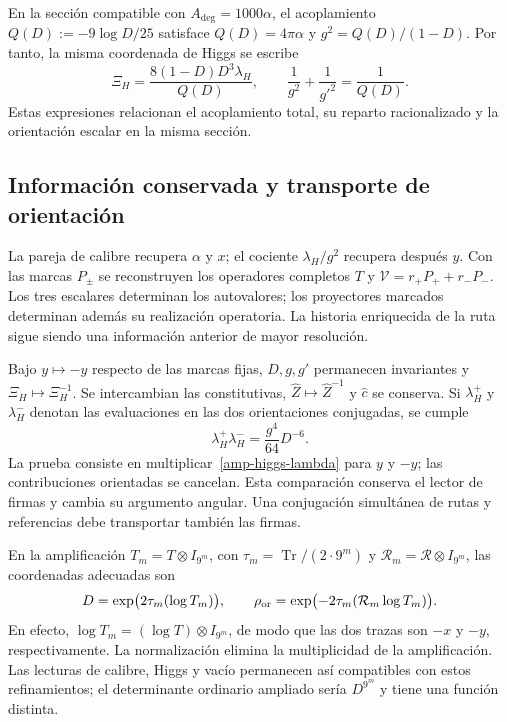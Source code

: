 En la sección compatible con $A_{\deg}=1000\alpha$, el acoplamiento
$Q(D):=-9\log D/25$ satisface $Q(D)=4\pi\alpha$ y
$g^2=Q(D)/(1-D)$. Por tanto, la misma coordenada de Higgs se escribe
\begin{equation}
 \Xi_H=\frac{8(1-D)D^3\lambda_H}{Q(D)},\qquad
 \frac1{g^2}+\frac1{g'^2}=\frac1{Q(D)}.
 \label{amp-higgs-curva}
\end{equation}
Estas expresiones relacionan el acoplamiento total, su reparto racionalizado
y la orientación escalar en la misma sección.

\subsection{Información conservada y transporte de orientación}

La pareja de calibre recupera $\alpha$ y $x$; el cociente
$\lambda_H/g^2$ recupera después $y$. Con las marcas $P_\pm$ se reconstruyen
los operadores completos $T$ y $\mathcal V=r_+P_++r_-P_-$.
Los tres escalares determinan los autovalores; los proyectores marcados
determinan además su realización operatoria. La historia enriquecida de la
ruta sigue siendo una información anterior de mayor resolución.

Bajo $y\mapsto-y$ respecto de las marcas fijas, $D,g,g'$ permanecen
invariantes y $\Xi_H\mapsto\Xi_H^{-1}$. Se intercambian las constitutivas,
$\widehat Z\mapsto\widehat Z^{-1}$ y $\widehat c$ se conserva.
Si $\lambda_H^+$ y $\lambda_H^-$ denotan las evaluaciones en las dos
orientaciones conjugadas, se cumple
\begin{equation}
 \lambda_H^+\lambda_H^-
 =\frac{g^4}{64}D^{-6}.
 \label{amp-higgs-orientacion}
\end{equation}
La prueba consiste en multiplicar~\eqref{amp-higgs-lambda} para $y$ y $-y$;
las contribuciones orientadas se cancelan. Esta comparación conserva el
lector de firmas y cambia su argumento angular. Una conjugación simultánea
de rutas y referencias debe transportar también las firmas.

En la amplificación $T_m=T\otimes I_{9^m}$, con
$\tau_m=\operatorname{Tr}/(2\cdot9^m)$ y
$\mathcal R_m=\mathcal R\otimes I_{9^m}$, las coordenadas adecuadas son
\begin{equation}
 D=\exp\bigl(2\tau_m(\log T_m)\bigr),\qquad
 \rho_{\rm or}=\exp\bigl(-2\tau_m(\mathcal R_m\log T_m)\bigr).
 \label{amp-higgs-refinamiento}
\end{equation}
En efecto, $\log T_m=(\log T)\otimes I_{9^m}$, de modo que las dos trazas
son $-x$ y $-y$, respectivamente. La normalización elimina la multiplicidad
de la amplificación. Las lecturas de calibre, Higgs y vacío permanecen así
compatibles con estos refinamientos; el determinante ordinario ampliado
sería $D^{9^m}$ y tiene una función distinta.

